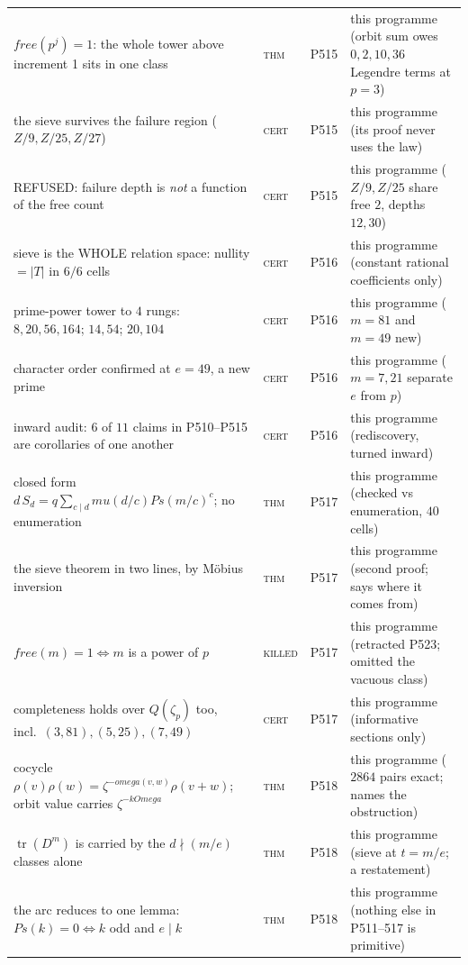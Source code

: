 \documentclass[12pt,a4paper]{article}
\def\mathbb#1{#1}%
\def\mathrm#1{#1}%
\def\mathbf#1{#1}%
\def\omega{omega}%
\def\mu{mu}%
\def\Omega{Omega}%
\theoremstyle{definition}
\newcommand{\ZZ}{\mathbb{Z}}
\begin{document}
\begin{center}
\begin{tabular}{@{}p{}llp{}@{}}
$\mathrm{free}(p^j)=1$: the whole tower above increment 1 sits in one class & \textsc{thm} & P515 & this programme (orbit sum owes $0,2,10,36$ Legendre terms at $p{=}3$) \\
the sieve survives the failure region ($\ZZ/9,\ZZ/25,\ZZ/27$) & \textsc{cert} & P515 & this programme (its proof never uses the law) \\
REFUSED: failure depth is \emph{not} a function of the free count & \textsc{cert} & P515 & this programme ($\ZZ/9,\ZZ/25$ share free $2$, depths $12,30$) \\
sieve is the WHOLE relation space: nullity $=\lvert T\rvert$ in $6/6$ cells & \textsc{cert} & P516 & this programme (constant rational coefficients only) \\
prime-power tower to $4$ rungs: $8,20,56,164$; $14,54$; $20,104$ & \textsc{cert} & P516 & this programme ($m{=}81$ and $m{=}49$ new) \\
character order confirmed at $e{=}49$, a new prime & \textsc{cert} & P516 & this programme ($m{=}7,21$ separate $e$ from $p$) \\
inward audit: $6$ of $11$ claims in P510--P515 are corollaries of one another & \textsc{cert} & P516 & this programme (rediscovery, turned inward) \\
closed form $d\,S_d=q\sum_{c\mid d}\mu(d/c)\mathrm{Ps}(m/c)^c$; no enumeration & \textsc{thm} & P517 & this programme (checked vs enumeration, $40$ cells) \\
the sieve theorem in two lines, by Möbius inversion & \textsc{thm} & P517 & this programme (second proof; says where it comes from) \\
$\mathrm{free}(m)=1\iff m$ is a power of $p$ & \textsc{killed} & P517 & this programme (retracted P523; omitted the vacuous class) \\
completeness holds over $\mathbf Q(\zeta_p)$ too, incl.\ $(3,81),(5,25),(7,49)$ & \textsc{cert} & P517 & this programme (informative sections only) \\
cocycle $\rho(v)\rho(w)=\zeta^{-\omega(v,w)}\rho(v{+}w)$; orbit value carries $\zeta^{-k\Omega}$ & \textsc{thm} & P518 & this programme ($2864$ pairs exact; names the obstruction) \\
$\operatorname{tr}(D^m)$ is carried by the $d\nmid(m/e)$ classes alone & \textsc{thm} & P518 & this programme (sieve at $t{=}m/e$; a restatement) \\
the arc reduces to one lemma: $\mathrm{Ps}(k){=}0\iff k$ odd and $e\mid k$ & \textsc{thm} & P518 & this programme (nothing else in P511--517 is primitive) \\

\end{tabular}
\end{center}
\end{document}
